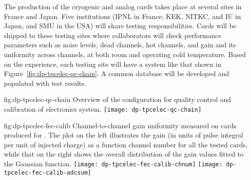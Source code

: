 The production of the cryogenic  and analog  cards takes place at several sites in France and Japan. Five institutions (IPNL in France; KEK, NITKC, and IU in Japan, and SMU in the USA) will share testing responsibilities. Cards will be shipped to these testing sites where collaborators will check performance parameters such as noise levels, dead channels, hot channels, and gain and its uniformity across channels, at both room and operating cold temperature. Based on the  experience, each testing site will have a system like that shown in Figure~\ref{fig:dp-tpcelec-qc-chain}. %
A common database will be developed and populated with test results. 

\begin{dunefigure}{fig:dp-tpcelec-qc-chain}
{Overview of the configuration for quality control and calibration of  electronics system.}
\texttt{[image: dp-tpcelec-qc-chain]}
\end{dunefigure}

\begin{dunefigure}{fig:dp-tpcelec-fec-calib}
{Channel-to-channel gain uniformity measured on  cards produced for . The plot on the left illustrates the gain (in units of pulse integral per unit of injected charge) as a function channel number for all the tested cards, while that on the right shows the overall distribution of the gain values fitted to the Gaussian function.}
\texttt{[image: dp-tpcelec-fec-calib-chnum]}
\texttt{[image: dp-tpcelec-fec-calib-adcsum]}
\end{dunefigure}


